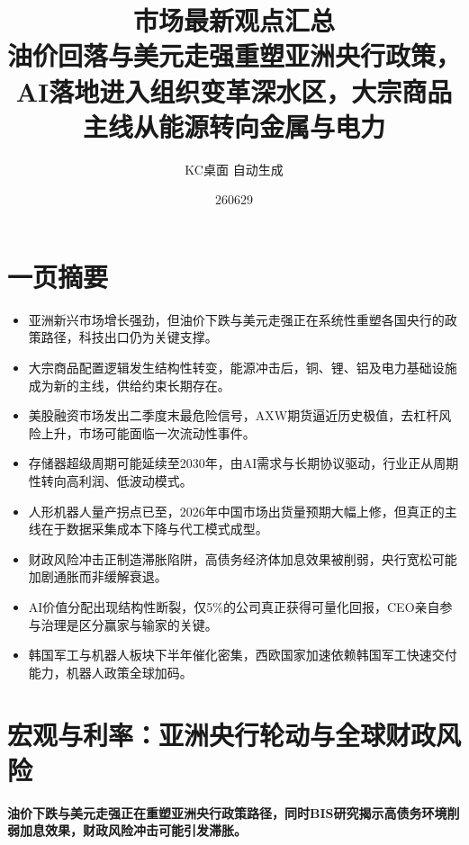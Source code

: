 \documentclass[11pt]{ctexart}
\title{\textbf{市场最新观点汇总}\\[0.4em]{\large 油价回落与美元走强重塑亚洲央行政策，AI落地进入组织变革深水区，大宗商品主线从能源转向金属与电力}}
\author{KC桌面 自动生成}
\date{260629}
\begin{document}
\maketitle
\tableofcontents
\newpage
\section{一页摘要}
\begin{itemize}
  \item 亚洲新兴市场增长强劲，但油价下跌与美元走强正在系统性重塑各国央行的政策路径，科技出口仍为关键支撑。
  \item 大宗商品配置逻辑发生结构性转变，能源冲击后，铜、锂、铝及电力基础设施成为新的主线，供给约束长期存在。
  \item 美股融资市场发出二季度末最危险信号，AXW期货逼近历史极值，去杠杆风险上升，市场可能面临一次流动性事件。
  \item 存储器超级周期可能延续至2030年，由AI需求与长期协议驱动，行业正从周期性转向高利润、低波动模式。
  \item 人形机器人量产拐点已至，2026年中国市场出货量预期大幅上修，但真正的主线在于数据采集成本下降与代工模式成型。
  \item 财政风险冲击正制造滞胀陷阱，高债务经济体加息效果被削弱，央行宽松可能加剧通胀而非缓解衰退。
  \item AI价值分配出现结构性断裂，仅5\%的公司真正获得可量化回报，CEO亲自参与治理是区分赢家与输家的关键。
  \item 韩国军工与机器人板块下半年催化密集，西欧国家加速依赖韩国军工快速交付能力，机器人政策全球加码。
\end{itemize}
\section{宏观与利率：亚洲央行轮动与全球财政风险}
\textbf{油价下跌与美元走强正在重塑亚洲央行政策路径，同时BIS研究揭示高债务环境削弱加息效果，财政风险冲击可能引发滞胀。}
\end{document}
